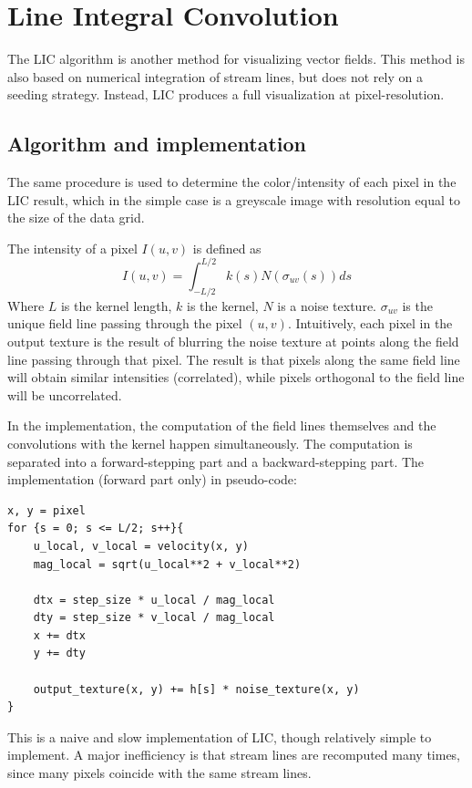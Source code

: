 \documentclass{article}
\begin{document}
\section{Line Integral Convolution}
The LIC algorithm is another method for visualizing vector fields. This method is also based on numerical integration of stream lines,
but does not rely on a seeding strategy. Instead, LIC produces a full visualization at pixel-resolution.

\subsection{Algorithm and implementation}
The same procedure is used to determine the color/intensity of each pixel in the LIC result, which in the simple case is a greyscale image
with resolution equal to the size of the data grid.

The intensity of a pixel $I(u, v)$ is defined as
$$I(u, v) = \int_{-L/2}^{L/2}k(s)N(\sigma_{uv}(s))ds$$
Where $L$ is the kernel length, $k$ is the kernel, $N$ is a noise
texture. $\sigma_{uv}$ is the unique field line passing through the pixel $(u, v)$. Intuitively, each pixel
in the output texture is the result of blurring the noise texture at points along the field line passing through that pixel.
The result is that pixels along the same field line will obtain similar intensities (correlated), while pixels orthogonal to the field line will be uncorrelated.


In the implementation, the computation of the field lines themselves and the convolutions with the kernel happen simultaneously.
The computation is separated into a forward-stepping part and a backward-stepping part.
The implementation (forward part only) in pseudo-code:
\begin{verbatim}
x, y = pixel
for {s = 0; s <= L/2; s++}{
    u_local, v_local = velocity(x, y)
    mag_local = sqrt(u_local**2 + v_local**2) 

    dtx = step_size * u_local / mag_local
    dty = step_size * v_local / mag_local
    x += dtx
    y += dty

    output_texture(x, y) += h[s] * noise_texture(x, y)
}

\end{verbatim}
This is a naive and slow implementation of LIC, though relatively simple to implement.
A major inefficiency is that stream lines are recomputed many times, since many pixels
coincide with the same stream lines.
\end{document}
